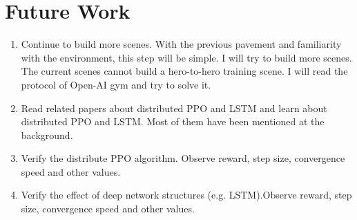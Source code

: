 \documentclass[runningheads]{llncs}
\begin{document}
\section{Future Work}
\begin{enumerate}
\item Continue to build more scenes. With the previous pavement and familiarity with the environment, this step will be simple. I will try to build more scenes. The current scenes cannot build a hero-to-hero training scene. I will read the protocol of Open-AI gym and try to solve it.\\
\item Read related papers about distributed PPO and LSTM and learn about distributed PPO and LSTM. Most of them have been mentioned at the background.\\
\item Verify the distribute PPO algorithm. Observe reward, step size, convergence speed and other values.\\
\item Verify the effect of deep network structures (e.g. LSTM).Observe reward, step size, convergence speed and other values.
\end{enumerate}
%
%
%
% 


%
\end{document}
